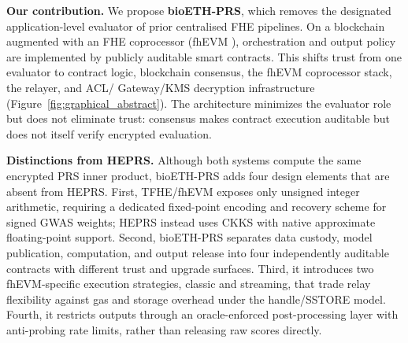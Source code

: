 \documentclass[10pt,twocolumn]{article}
\begin{document}
\textbf{Our contribution.}
We propose \textbf{bioETH-PRS}, which removes the designated application-level
evaluator of prior centralised FHE pipelines.  On a blockchain augmented with an FHE
coprocessor (fhEVM \citep{zamafhevm}), orchestration and output policy are implemented
by publicly auditable smart contracts.  This shifts trust from one evaluator to contract
logic, blockchain consensus, the fhEVM coprocessor stack, the relayer, and ACL/
Gateway/KMS decryption infrastructure (Figure~\ref{fig:graphical_abstract}).  The
architecture minimizes the evaluator role but does not eliminate trust: consensus makes
contract execution auditable but does not itself verify encrypted evaluation.

\smallskip\noindent\textbf{Distinctions from HEPRS.}
Although both systems compute the same encrypted PRS inner product, bioETH-PRS adds
four design elements that are absent from HEPRS.  First, TFHE/fhEVM exposes only
unsigned integer arithmetic, requiring a dedicated fixed-point encoding and recovery
scheme for signed GWAS weights; HEPRS instead uses CKKS with native approximate
floating-point support.  Second, bioETH-PRS separates data custody, model publication,
computation, and output release into four independently auditable contracts with
different trust and upgrade surfaces.  Third, it introduces two fhEVM-specific
execution strategies, classic and streaming, that trade relay flexibility against
gas and storage overhead under the handle/SSTORE model.  Fourth, it restricts outputs
through an oracle-enforced post-processing layer with anti-probing rate limits, rather
than releasing raw scores directly.
\end{document}
